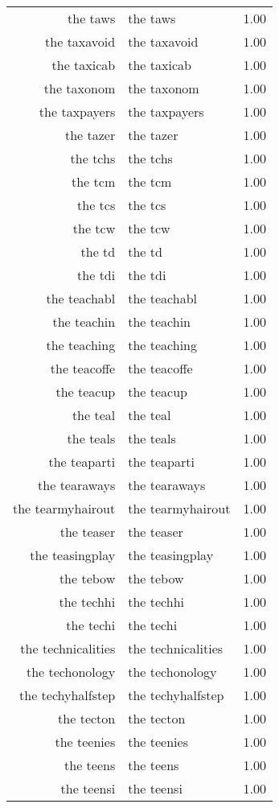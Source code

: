 \begin{table}[ht]
\begin{tabular}{rlr}
  the taws & the taws & 1.00 \\ 
  the taxavoid & the taxavoid & 1.00 \\ 
  the taxicab & the taxicab & 1.00 \\ 
  the taxonom & the taxonom & 1.00 \\ 
  the taxpayers & the taxpayers & 1.00 \\ 
  the tazer & the tazer & 1.00 \\ 
  the tchs & the tchs & 1.00 \\ 
  the tcm & the tcm & 1.00 \\ 
  the tcs & the tcs & 1.00 \\ 
  the tcw & the tcw & 1.00 \\ 
  the td & the td & 1.00 \\ 
  the tdi & the tdi & 1.00 \\ 
  the teachabl & the teachabl & 1.00 \\ 
  the teachin & the teachin & 1.00 \\ 
  the teaching & the teaching & 1.00 \\ 
  the teacoffe & the teacoffe & 1.00 \\ 
  the teacup & the teacup & 1.00 \\ 
  the teal & the teal & 1.00 \\ 
  the teals & the teals & 1.00 \\ 
  the teaparti & the teaparti & 1.00 \\ 
  the tearaways & the tearaways & 1.00 \\ 
  the tearmyhairout & the tearmyhairout & 1.00 \\ 
  the teaser & the teaser & 1.00 \\ 
  the teasingplay & the teasingplay & 1.00 \\ 
  the tebow & the tebow & 1.00 \\ 
  the techhi & the techhi & 1.00 \\ 
  the techi & the techi & 1.00 \\ 
  the technicalities & the technicalities & 1.00 \\ 
  the techonology & the techonology & 1.00 \\ 
  the techyhalfstep & the techyhalfstep & 1.00 \\ 
  the tecton & the tecton & 1.00 \\ 
  the teenies & the teenies & 1.00 \\ 
  the teens & the teens & 1.00 \\ 
  the teensi & the teensi & 1.00 \\ 

\end{tabular}
\end{table}
